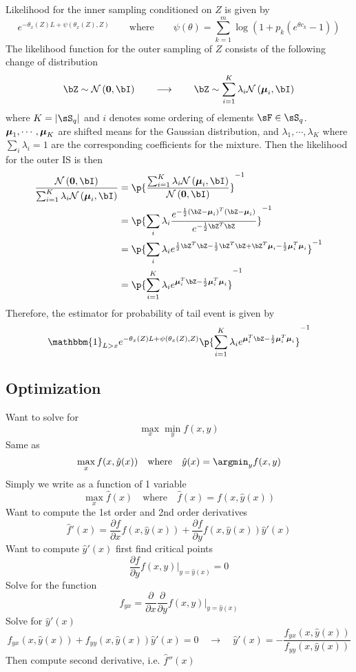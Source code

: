 \documentclass[11pt]{article}
\begin{document}
Likelihood for the inner sampling conditioned on $Z$ is given by 
\[
    e^{-\theta_x(Z)L + \psi(\theta_x(Z), Z)}
    \qquad \text{where} \qquad 
    \psi(\theta) = \sum_{k=1}^m \log (1 + p_k (e^{\theta c_k} - 1))
\]
The likelihood function for the outer sampling of $Z$ consists of the following change of distribution
\[
    \bZ \sim \normal{\mathbf{0}, \bI}
    \qquad \longrightarrow \qquad 
    \bZ \sim \sum_{i=1}^K \lambda_{i} \normal{\bmu_i, \bI}
\]
where $K = \abs{\sS_q}$ and $i$ denotes some ordering of elements $\sF \in \sS_q$. $\boldsymbol{\mu}_1,\cdots,\boldsymbol{\mu}_K$ are shifted means for the Gaussian distribution, and $\lambda_1,\cdots, \lambda_K$ where $\textstyle\sum_i \lambda_i = 1$ are the corresponding coefficients for the mixture. Then the likelihood for the outer IS is then 
\begin{align*}
    \frac{\normal{\mathbf{0}, \bI}}{\sum_{i=1}^K \lambda_{i} \normal{\bmu_i, \bI}}
    &= \p{
        \frac{\sum_{i=1}^K \lambda_{i} \normal{\bmu_i, \bI}}{\normal{\mathbf{0}, \bI}}
    }^{-1} \\
    &= \p{
        \sum_i \lambda_i \frac{e^{-\frac{1}{2} (\bZ - \bmu_i)^T(\bZ - \bmu_i)}}{ e^{-\frac{1}{2} \bZ^T \bZ} }
    }^{-1} \\
    &= \p{
        \sum_i \lambda_i e^{ \frac{1}{2}\bZ^T\bZ - \frac{1}{2} \bZ^T\bZ + \bZ^T \bmu_i - \frac{1}{2} \bmu_i^T \bmu_i }
    }^{-1} \\ 
    &= \p{
        \sum_{i=1}^K \lambda_{i} e^{\bmu_i^T \bZ - \frac{1}{2}\bmu_i^T\bmu_i }
    }^{-1}
\end{align*}
Therefore, the estimator for probability of tail event is given by 
\[
    \mathbbm{1}_{L>x} e^{-\theta_x(Z)L + \psi(\theta_x(Z), Z)} \p{
        \sum_{i=1}^K \lambda_{i} e^{\bmu_i^T \bZ - \frac{1}{2}\bmu_i^T\bmu_i }
    }^{-1}
\]


\newpage 
\subsection*{Optimization}

Want to solve for 
\[
    \max_x \min_y f(x, y)    
\]
Same as 
\[
    \max_x f(x, \hat{y}(x))
    \quad \text{where} \quad 
    \hat{y}(x) = \argmin_y f(x, y)
\]
Simply we write as a function of 1 variable
\[
    \max_x \hat{f}(x)    
    \quad \text{where}\quad 
    \hat{f}(x) = f(x, \hat{y}(x))
\]
Want to compute the 1st order and 2nd order derivatives
\[
    \hat{f}'(x) = \frac{\partial f}{\partial x} f(x, \hat{y}(x)) + \frac{\partial f}{\partial y} f(x, \hat{y}(x)) \hat{y}'(x)
\]
Want to compute $\hat{y}'(x)$ first find critical points
\[
    \frac{\partial f}{\partial y} f(x, y) |_{y=\hat{y}(x)} = 0
\]
Solve for the function
\[
    f_{yx} = \frac{\partial}{\partial x} \frac{\partial}{\partial y} f(x, y) |_{y=\hat{y}(x)}
\]
Solve for $\hat{y}'(x)$ 
\[
    f_{yx}(x, \hat{y}(x)) + f_{yy}(x, \hat{y}(x)) \hat{y}'(x) = 0
    \quad \rightarrow \quad 
    \hat{y}'(x) = - \frac{f_{yx}(x, \hat{y}(x))}{f_{yy}(x, \hat{y}(x))}
\]
Then compute second derivative, i.e.  $\hat{f}''(x)$ 
\end{document}
